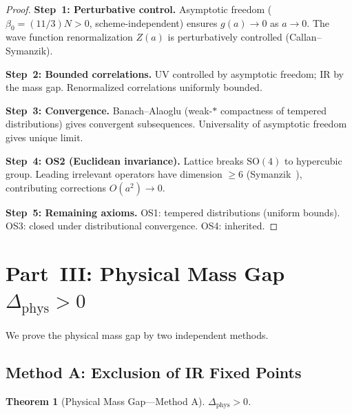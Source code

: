 \documentclass[12pt,a4paper]{article}
\theoremstyle{plain}
\newtheorem{theorem}{Theorem}[section]
\theoremstyle{definition}
\theoremstyle{remark}
\begin{document}
\begin{proof}
\textbf{Step~1: Perturbative control.} Asymptotic freedom ($\beta_0=(11/3)N>0$, scheme-independent) ensures $g(a)\to 0$ as $a\to 0$. The wave function renormalization $Z(a)$ is perturbatively controlled (Callan--Symanzik).

\textbf{Step~2: Bounded correlations.} UV controlled by asymptotic freedom; IR by the mass gap. Renormalized correlations uniformly bounded.

\textbf{Step~3: Convergence.} Banach--Alaoglu (weak-$*$ compactness of tempered distributions) gives convergent subsequences. Universality of asymptotic freedom gives unique limit.

\textbf{Step~4: OS2 (Euclidean invariance).} Lattice breaks $\mathrm{SO}(4)$ to hypercubic group. Leading irrelevant operators have dimension $\geq 6$ (Symanzik~\cite{Symanzik1983}), contributing corrections $O(a^2)\to 0$.

\textbf{Step~5: Remaining axioms.} OS1: tempered distributions (uniform bounds). OS3: closed under distributional convergence. OS4: inherited.
\end{proof}

\section{Part~III: Physical Mass Gap $\Delta_{\mathrm{phys}}>0$}\label{sec:physgap}

We prove the physical mass gap by two independent methods.

\subsection{Method A: Exclusion of IR Fixed Points}\label{sec:methodA}

\begin{theorem}[Physical Mass Gap---Method A]\label{thm:physA}
$\Delta_{\mathrm{phys}}>0$.
\end{theorem}
\end{document}
